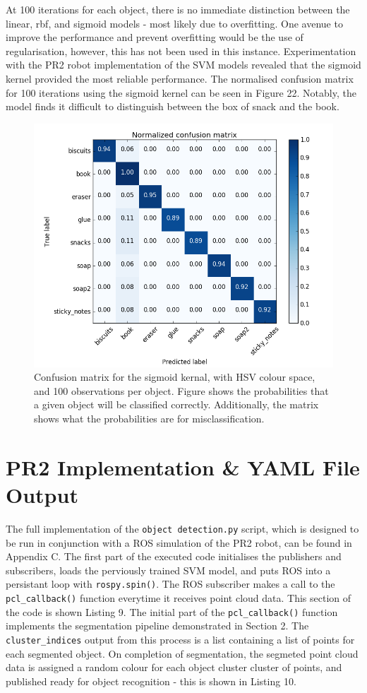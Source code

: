\documentclass[a4paper]{article}
\begin{document}
At 100 iterations for each object, there is no immediate distinction between the linear, rbf, and sigmoid models - most likely due to overfitting. One avenue to improve the performance and prevent overfitting would be the use of regularisation, however, this has not been used in this instance. Experimentation with the PR2 robot implementation of the SVM models revealed that the sigmoid kernel provided the most reliable performance. The normalised confusion matrix for 100 iterations using the sigmoid kernel can be seen in Figure 22. Notably, the model finds it difficult to distinguish between the box of snack and the book.
\begin{figure}[h]
	\centering
	\includegraphics[scale=0.55]{normalised_confusion_matrix}
	\caption{Confusion matrix for the sigmoid kernal, with HSV colour space, and 100 observations per object. Figure shows the probabilities that a given object will be classified correctly. Additionally, the matrix shows what the probabilities are for misclassification.}
\end{figure}
\newpage

\section{PR2 Implementation \& YAML File Output}
The full implementation of the \verb|object detection.py| script, which is designed to be run in conjunction with a ROS simulation of the PR2 robot, can be found in Appendix C. The first part of the executed code initialises the publishers and subscribers, loads the perviously trained SVM model, and puts ROS into a persistant loop with \verb|rospy.spin()|. The ROS subscriber makes a call to the \verb|pcl_callback()| function everytime it receives point cloud data. This section of the code is shown  Listing 9. The initial part of the \verb|pcl_callback()| function implements the segmentation pipeline demonstrated in Section 2. The \verb|cluster_indices| output from this process is a list containing a list of points for each segmented object. On completion of segmentation, the segmeted point cloud data is assigned a random colour for each object cluster cluster of points, and published ready for object recognition - this is shown in Listing 10.\\
\end{document}

